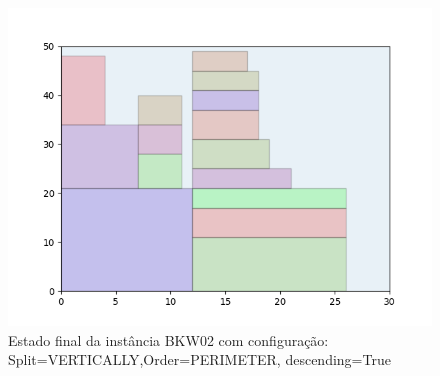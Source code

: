 \begin{figure}[H]
    \centering
    \caption[]{Estado final da instância BKW02 com configuração: Split=VERTICALLY,Order=PERIMETER, descending=True}
    \label{fig:bkw02-vertically-perimeter-true}
    \includegraphics[scale=0.5]{output/figures/bkw/bkw02/vertically/perimeter/true/00}
\end{figure}